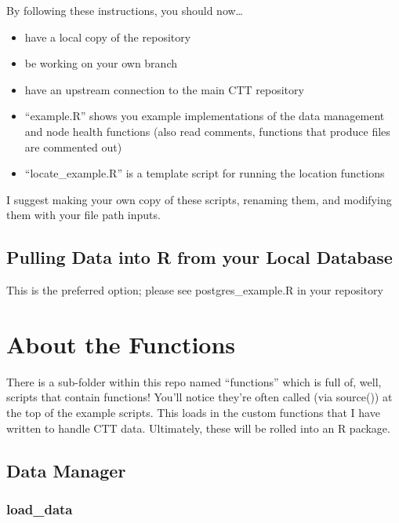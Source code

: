 \documentclass[
]{book}
\begin{document}
By following these instructions, you should now\ldots{}

\begin{itemize}
\item
  have a local copy of the repository\\
\item
  be working on your own branch\\
\item
  have an upstream connection to the main CTT repository
\item
  ``example.R'' shows you example implementations of the data management and node health functions (also read comments, functions that produce files are commented out)
\item
  ``locate\_example.R'' is a template script for running the location functions
\end{itemize}

I suggest making your own copy of these scripts, renaming them, and modifying them with your file path inputs.

\section{Pulling Data into R from your Local Database}\label{pulling-data-into-r-from-your-local-database}

This is the preferred option; please see postgres\_example.R in your repository

\chapter{About the Functions}\label{about-the-functions}

There is a sub-folder within this repo named ``functions'' which is full of, well, scripts that contain functions! You'll notice they're often called (via source()) at the top of the example scripts. This loads in the custom functions that I have written to handle CTT data. Ultimately, these will be rolled into an R package.

\section{Data Manager}\label{data-manager}

\subsection{load\_data}\label{load_data}
\end{document}
